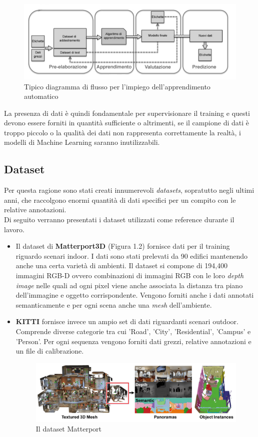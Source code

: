 \begin{figure}[h!]
	\centering
	\includegraphics[width=1.1\linewidth]{../immagini/mlprocess}
	\caption[Processo di apprendimento]{Tipico diagramma di flusso per l'impiego dell'apprendimento automatico }
	\label{fig:mlprocess}
\end{figure}
La presenza di dati è quindi fondamentale per supervisionare il training e questi devono essere forniti in quantità sufficiente o altrimenti, se il campione di dati è troppo piccolo o la qualità dei dati non rappresenta correttamente la realtà, i modelli di Machine Learning saranno inutilizzabili. 
\subsection{Dataset}
Per questa ragione sono stati creati innumerevoli \textit{datasets}, sopratutto negli ultimi anni, che raccolgono enormi quantità di dati specifici per un compito con le relative annotazioni. \\
Di seguito verranno presentati i dataset utilizzati come reference durante il lavoro. 
\begin{itemize}
\item Il dataset di \textbf{Matterport3D} \cite{Matter} (Figura 1.2) fornisce dati per il training riguardo scenari indoor. I dati sono stati prelevati da 90 edifici mantenendo anche una certa varietà di ambienti. Il dataset si compone di 194,400 immagini RGB-D ovvero combinazioni di immagini RGB con le loro \textit{depth image} nelle quali ad ogni pixel viene anche associata la distanza tra piano dell'immagine e oggetto corrispondente. Vengono forniti anche i dati annotati semanticamente e per ogni scena anche una \textit{mesh} dell'ambiente. 

\item \textbf{KITTI } fornisce invece un ampio set di dati riguardanti scenari outdoor. Comprende diverse categorie tra cui 'Road', 'City', 'Residential', 'Campus' e 'Person'. Per ogni sequenza vengono forniti dati grezzi, relative annotazioni e un file di calibrazione. 

\begin{figure}
	\centering
	\includegraphics[width=1\linewidth]{../immagini/matterport3d}
	\caption[Matterport3d]{Il dataset Matterport }
	\label{fig:mlprocess}
\end{figure}
\end{itemize}
